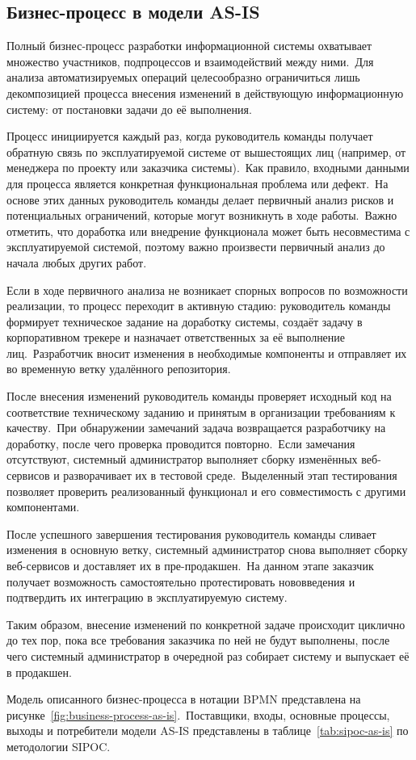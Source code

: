 \subsection{Бизнес-процесс в модели AS-IS}\label{subsec:business-process-in-as-is-model}

Полный бизнес-процесс разработки информационной системы охватывает множество участников, подпроцессов и взаимодействий между ними.\ Для анализа автоматизируемых операций целесообразно ограничиться лишь декомпозицией процесса внесения изменений в действующую информационную систему: от постановки задачи до её выполнения.

Процесс инициируется каждый раз, когда руководитель команды получает обратную связь по эксплуатируемой системе от вышестоящих лиц (например, от менеджера по проекту или заказчика системы).\ Как правило, входными данными для процесса является конкретная функциональная проблема или дефект.\ На основе этих данных руководитель команды делает первичный анализ рисков и потенциальных ограничений, которые могут возникнуть в ходе работы.\ Важно отметить, что доработка или внедрение функционала может быть несовместима с эксплуатируемой системой, поэтому важно произвести первичный анализ до начала любых других работ.

Если в ходе первичного анализа не возникает спорных вопросов по возможности реализации, то процесс переходит в активную стадию: руководитель команды формирует техническое задание на доработку системы, создаёт задачу в корпоративном трекере и назначает ответственных за её выполнение лиц.\ Разработчик вносит изменения в необходимые компоненты и отправляет их во временную ветку удалённого репозитория.

После внесения изменений руководитель команды проверяет исходный код на соответствие техническому заданию и принятым в организации требованиям к качеству.\ При обнаружении замечаний задача возвращается разработчику на доработку, после чего проверка проводится повторно.\ Если замечания отсутствуют, системный администратор выполняет сборку изменённых веб-сервисов и разворачивает их в тестовой среде.\ Выделенный этап тестирования позволяет проверить реализованный функционал и его совместимость с другими компонентами.

После успешного завершения тестирования руководитель команды сливает изменения в основную ветку, системный администратор снова выполняет сборку веб-сервисов и доставляет их в пре-продакшен.\ На данном этапе заказчик получает возможность самостоятельно протестировать нововведения и подтвердить их интеграцию в эксплуатируемую систему.

Таким образом, внесение изменений по конкретной задаче происходит циклично до тех пор, пока все требования заказчика по ней не будут выполнены, после чего системный администратор в очередной раз собирает систему и выпускает её в продакшен.

Модель описанного бизнес-процесса в нотации BPMN представлена на рисунке~\ref{fig:business-process-as-is}.\ Поставщики, входы, основные процессы, выходы и потребители модели AS-IS представлены в таблице~\ref{tab:sipoc-as-is} по методологии SIPOC.
